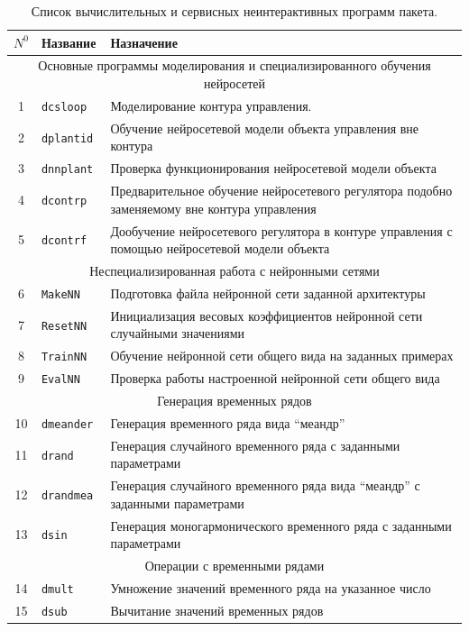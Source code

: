 \begin{table}%
\centering
\caption{Список вычислительных и сервисных неинтерактивных программ пакета.}
\label{tabl:prog_list}
\begin{tabular}{|c|l|p{13cm}|}
\hline
$N^0$ & Название & Назначение \\
\hline
\hline
\multicolumn{3}{|c|}{Основные программы моделирования и специализированного обучения нейросетей} \\
\hline
1 & \tt dcsloop & Моделирование контура управления. \\
2 & \tt dplantid & Обучение нейросетевой модели объекта управления вне контура  \\
3 & \tt dnnplant & Проверка функционирования нейросетевой модели объекта \\
4 & \tt dcontrp & Предварительное обучение нейросетевого регулятора подобно заменяемому вне контура управления \\
5 & \tt dcontrf & Дообучение нейросетевого регулятора в контуре управления с помощью нейросетевой модели объекта \\
\hline
\multicolumn{3}{|c|}{Неспециализированная работа с нейронными сетями} \\
\hline
6 & \tt MakeNN & Подготовка файла нейронной сети заданной архитектуры \\
7 & \tt ResetNN & Инициализация весовых коэффициентов нейронной сети случайными значениями \\
8 & \tt TrainNN & Обучение нейронной сети общего вида на заданных примерах \\
9 & \tt EvalNN & Проверка работы настроенной нейронной сети общего вида \\
\hline
\multicolumn{3}{|c|}{Генерация временных рядов} \\
\hline
10 & \tt dmeander & Генерация временного ряда вида ``меандр'' \\
11 & \tt drand & Генерация случайного временного ряда с заданными параметрами \\
12 & \tt drandmea & Генерация случайного временного ряда вида ``меандр'' с заданными параметрами \\
13 & \tt dsin & Генерация моногармонического временного ряда с заданными параметрами \\
\hline
\multicolumn{3}{|c|}{Операции с временными рядами} \\
\hline
14 & \tt dmult & Умножение значений временного ряда на указанное число \\
15 & \tt dsub & Вычитание значений временных рядов \\

\end{tabular}
\end{table}
